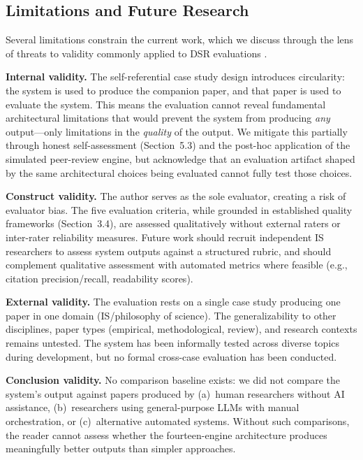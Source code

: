 \documentclass{article}
\begin{document}
\subsection{Limitations and Future Research}

Several limitations constrain the current work, which we discuss through the lens of threats to validity commonly applied to DSR evaluations \citep{hevner2004design}.

\textbf{Internal validity.} The self-referential case study design introduces circularity: the system is used to produce the companion paper, and that paper is used to evaluate the system. This means the evaluation cannot reveal fundamental architectural limitations that would prevent the system from producing \emph{any} output---only limitations in the \emph{quality} of the output. We mitigate this partially through honest self-assessment (Section~5.3) and the post-hoc application of the simulated peer-review engine, but acknowledge that an evaluation artifact shaped by the same architectural choices being evaluated cannot fully test those choices.

\textbf{Construct validity.} The author serves as the sole evaluator, creating a risk of evaluator bias. The five evaluation criteria, while grounded in established quality frameworks (Section~3.4), are assessed qualitatively without external raters or inter-rater reliability measures. Future work should recruit independent IS researchers to assess system outputs against a structured rubric, and should complement qualitative assessment with automated metrics where feasible (e.g., citation precision/recall, readability scores).

\textbf{External validity.} The evaluation rests on a single case study producing one paper in one domain (IS/philosophy of science). The generalizability to other disciplines, paper types (empirical, methodological, review), and research contexts remains untested. The system has been informally tested across diverse topics during development, but no formal cross-case evaluation has been conducted.

\textbf{Conclusion validity.} No comparison baseline exists: we did not compare the system's output against papers produced by (a)~human researchers without AI assistance, (b)~researchers using general-purpose LLMs with manual orchestration, or (c)~alternative automated systems. Without such comparisons, the reader cannot assess whether the fourteen-engine architecture produces meaningfully better outputs than simpler approaches.
\end{document}
